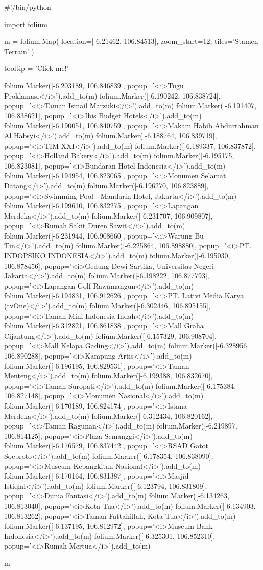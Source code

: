 #!/bin/python


import folium

m = folium.Map(
    location=[-6.21462, 106.84513],
    zoom_start=12,
    tiles='Stamen Terrain'
)

tooltip = 'Click me!'

folium.Marker([-6.203189, 106.846839], popup='<i>Tugu Proklamasi</i>').add_to(m)
folium.Marker([-6.190242, 106.838724], popup='<i>Taman Ismail Marzuki</i>').add_to(m)
folium.Marker([-6.191407, 106.838621], popup='<i>Ibis Budget Hotels</i>').add_to(m)
folium.Marker([-6.190051, 106.840759], popup='<i>Makam Habib Abdurrahman Al Habsyi</i>').add_to(m)
folium.Marker([-6.188764, 106.839719], popup='<i>TIM XXI</i>').add_to(m)
folium.Marker([-6.189337, 106.837872], popup='<i>Holland Bakery</i>').add_to(m)
folium.Marker([-6.195175, 106.823081], popup='<i>Bundaran Hotel Indonesia</i>').add_to(m)
folium.Marker([-6.194954, 106.823065], popup='<i>Monumen Selamat Datang</i>').add_to(m)
folium.Marker([-6.196270, 106.823889], popup='<i>Swimming Pool - Mandarin Hotel, Jakarta</i>').add_to(m)
folium.Marker([-6.199610, 106.832275], popup='<i>Lapangan Merdeka</i>').add_to(m)
folium.Marker([-6.231707, 106.909807], popup='<i>Rumah Sakit Duren Sawit</i>').add_to(m)
folium.Marker([-6.231944, 106.908660], popup='<i>Warung Bu Tin</i>').add_to(m)
folium.Marker([-6.225864, 106.898880], popup='<i>PT. INDOPSIKO INDONESIA</i>').add_to(m)
folium.Marker([-6.195030, 106.878456], popup='<i>Gedung Dewi Sartika, Universitas Negeri Jakarta</i>').add_to(m)
folium.Marker([-6.198222, 106.877793], popup='<i>Lapangan Golf Rawamangun</i>').add_to(m)
folium.Marker([-6.194831, 106.912626], popup='<i>PT. Lativi Media Karya (tvOne)</i>').add_to(m)
folium.Marker([-6.302446, 106.895155], popup='<i>Taman Mini Indonesia Indah</i>').add_to(m)
folium.Marker([-6.312821, 106.861838], popup='<i>Mall Graha Cijantung</i>').add_to(m)
folium.Marker([-6.157329, 106.908704], popup='<i>Mall Kelapa Gading</i>').add_to(m)
folium.Marker([-6.328956, 106.890288], popup='<i>Kampung Artis</i>').add_to(m)
folium.Marker([-6.196195, 106.829531], popup='<i>Taman Menteng</i>').add_to(m)
folium.Marker([-6.199388, 106.832670], popup='<i>Taman Suropati</i>').add_to(m)
folium.Marker([-6.175384, 106.827148], popup='<i>Monumen Nasional</i>').add_to(m)
folium.Marker([-6.170189, 106.824174], popup='<i>Istana Merdeka</i>').add_to(m)
folium.Marker([-6.312434, 106.820162], popup='<i>Taman Ragunan</i>').add_to(m)
folium.Marker([-6.219897, 106.814125], popup='<i>Plaza Semanggi</i>').add_to(m)
folium.Marker([-6.176579, 106.837442], popup='<i>RSAD Gatot Soebroto</i>').add_to(m)
folium.Marker([-6.178354, 106.838090], popup='<i>Museum Kebangkitan Nasional</i>').add_to(m)
folium.Marker([-6.170164, 106.831387], popup='<i>Masjid Istiqlal</i>').add_to(m)
folium.Marker([-6.123794, 106.831809], popup='<i>Dunia Fantasi</i>').add_to(m)
folium.Marker([-6.134263, 106.813040], popup='<i>Kota Tua</i>').add_to(m)
folium.Marker([-6.134903, 106.813262], popup='<i>Taman Fattahillah, Kota Tua</i>').add_to(m)
folium.Marker([-6.137195, 106.812972], popup='<i>Museum Bank Indonesia</i>').add_to(m)
folium.Marker([-6.325301, 106.852310], popup='<i>Rumah Mertua</i>').add_to(m)

m